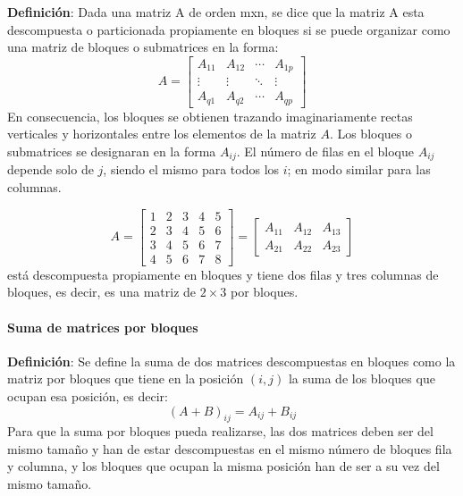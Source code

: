 \textbf{Definición}: Dada una matriz A de orden mxn, se dice que la matriz A esta descompuesta o particionada propiamente en bloques si se puede organizar como una matriz de bloques o submatrices en la forma:
\[
  A = \begin{bmatrix}
    A_{11} & A_{12} & \cdots & A_{1p}\\
    \vdots & \vdots & \ddots & \vdots\\
    A_{q1} & A_{q2} & \cdots & A_{qp}
  \end{bmatrix}
\]
En consecuencia, los bloques se obtienen trazando imaginariamente rectas verticales y horizontales entre los elementos de la matriz \(A\). Los bloques o submatrices se designaran en la forma \(A_{ij}\). El número de filas en el bloque \(A_{ij}\) depende solo de \(j\), siendo el mismo para todos los \(i\); en modo similar para las columnas.

\[
A = \left[\begin{array}{c|cc|cc}
  1 & 2 & 3 & 4 & 5 \\
  2 & 3 & 4 & 5 & 6 \\
  3 & 4 & 5 & 6 & 7 \\
  \hline
  4 & 5 & 6 & 7 & 8
\end{array}\right] = \begin{bmatrix}
  A_{11} & A_{12} & A_{13}\\
  A_{21} & A_{22} & A_{23}
\end{bmatrix}
\]
está descompuesta propiamente en bloques y tiene dos filas y tres columnas de bloques, es decir, es una matriz de \(2 \times 3\) por bloques.

\paragraph{Suma de matrices por bloques}

\textbf{Definición}: Se define la suma de dos matrices descompuestas en bloques como la matriz por bloques que tiene en la posición \((i, j)\) la suma de los bloques que ocupan esa posición, es decir:
\[
 (A+B)_{ij} = A_{ij} + B_{ij}
\]
Para que la suma por bloques pueda realizarse, las dos matrices deben ser del mismo tamaño y han de estar descompuestas en el mismo número de bloques fila y columna, y los bloques que ocupan la misma posición han de ser a su vez del mismo tamaño.

